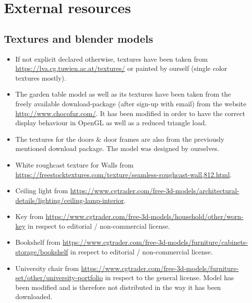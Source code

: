 \documentclass[12pt]{article}
\begin{document}
\section{External resources}

\subsection{Textures and blender models}

\begin{itemize}

\item If not explicit declared otherwise, textures have been taken from
\url{https://lva.cg.tuwien.ac.at/textures/} or painted by ourself (single color textures mostly).


\item The garden table model as well as its textures have been taken from the freely available download-package (after sign-up with email) from the website
\url{http://www.chocofur.com/}. It has been modified in order to have the correct display behaviour in OpenGL as well as a reduced triangle load.

\item The textures for the doors \& door frames are also from the previously mentioned download package. The model was designed by ourselves.


\item White roughcast texture for Walls from \url{https://freestocktextures.com/texture/seamless-roughcast-wall,812.html}.

\item Ceiling light from \url{https://www.cgtrader.com/free-3d-models/architectural-details/lighting/ceiling-lamp-interior}.

\item Key from \url{https://www.cgtrader.com/free-3d-models/household/other/worn-key} in respect to editorial / non-commercial license.

\item Bookshelf from \url{https://www.cgtrader.com/free-3d-models/furniture/cabinets-storage/bookshelf} in respect to editorial / non-commercial license.

\item University chair from \url{https://www.cgtrader.com/free-3d-models/furniture-set/other/university-portfolio} in respect to the general license. Model has been modified and is therefore not distributed in the way it has been downloaded.


\end{itemize}
\end{document}
